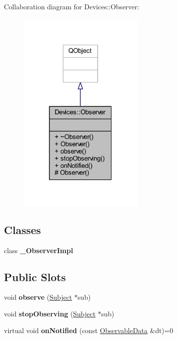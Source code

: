 Collaboration diagram for Devices\+:\+:Observer\+:\nopagebreak
\begin{figure}[H]
\begin{center}
\leavevmode
\includegraphics[width=175pt]{db/d51/class_devices_1_1_observer__coll__graph}
\end{center}
\end{figure}
\subsection*{Classes}
\begin{DoxyCompactItemize}
\item 
class {\bfseries \+\_\+\+Observer\+Impl}
\end{DoxyCompactItemize}
\subsection*{Public Slots}
\begin{DoxyCompactItemize}
\item 
\mbox{\label{class_devices_1_1_observer_a4d3064deb1916b289a653862e0b0c141}} 
void {\bfseries observe} (\hyperlink{class_devices_1_1_subject}{Subject} $\ast$sub)
\item 
\mbox{\label{class_devices_1_1_observer_a25201bb468d521bd5789c94ec08bc14c}} 
void {\bfseries stop\+Observing} (\hyperlink{class_devices_1_1_subject}{Subject} $\ast$sub)
\item 
\mbox{\label{class_devices_1_1_observer_a1dba681f223e67c2660d422cc4e7c6b5}} 
virtual void {\bfseries on\+Notified} (const \hyperlink{class_devices_1_1_observable_data}{Observable\+Data} \&dt)=0
\end{DoxyCompactItemize}
